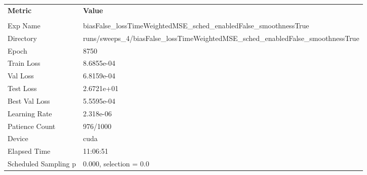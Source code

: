 \begin{tabular}{|l|l|}
\hline
\textbf{Metric} & \textbf{Value} \\\\
Exp Name & biasFalse_lossTimeWeightedMSE_sched_enabledFalse_smoothnessTrue \\ 
Directory & runs/sweeps_4/biasFalse_lossTimeWeightedMSE_sched_enabledFalse_smoothnessTrue \\ 
Epoch & 8750 \\ 
Train Loss & 8.6855e-04 \\ 
Val Loss & 6.8159e-04 \\ 
Test Loss & 2.6721e+01 \\ 
Best Val Loss & 5.5595e-04 \\ 
Learning Rate & 2.318e-06 \\ 
Patience Count & 976/1000 \\ 
Device & cuda \\ 
Elapsed Time & 11:06:51 \\ 
Scheduled Sampling p & 0.000, selection = 0.0 \\ 
\hline
\end{tabular}